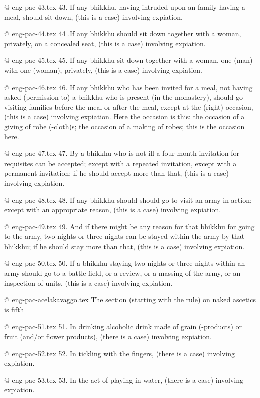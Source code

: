 @ eng-pac-43.tex
43. If any bhikkhu, having intruded upon an family having a meal, should sit down, (this is a case) involving expiation.

@ eng-pac-44.tex
44 .If any bhikkhu should sit down together with a woman, privately, on a concealed seat, (this is a case) involving expiation.

@ eng-pac-45.tex
45. If any bhikkhu sit down together with a woman, one (man) with one (woman), privately, (this is a case) involving expiation.

@ eng-pac-46.tex
46. If any bhikkhu who has been invited for a meal, not having asked (permission to) a bhikkhu who is present (in the monastery), should go visiting families before the meal or after the meal, except at the (right) occasion, (this is a case) involving expiation. Here the occasion is this: the occasion of a giving of robe (-cloth)s; the occasion of a making of robes; this is the occasion here.

@ eng-pac-47.tex
47. By a bhikkhu who is not ill a four-month invitation for requisites can be accepted; except with a repeated invitation, except with a permanent invitation; if he should accept more than that, (this is a case) involving expiation.

@ eng-pac-48.tex
48. If any bhikkhu should should go to visit an army in action; except with an appropriate reason, (this is a case) involving expiation.

@ eng-pac-49.tex
49. And if there might be any reason for that bhikkhu for going to the army, two nights or three nights can be stayed within the army by that bhikkhu; if he should stay more than that, (this is a case) involving expiation.

@ eng-pac-50.tex
50. If a bhikkhu staying two nights or three nights within an army should go to a battle-field, or a review, or a massing of the army, or an inspection of units, (this is a case) involving expiation.

@ eng-pac-acelakavaggo.tex
The section (starting with the rule) on naked ascetics is fifth

@ eng-pac-51.tex
51. In drinking alcoholic drink made of grain (-products) or fruit (and/or flower products), (there is a case) involving expiation.

@ eng-pac-52.tex
52. In tickling with the fingers, (there is a case) involving expiation.

@ eng-pac-53.tex
53. In the act of playing in water, (there is a case) involving expiation.

